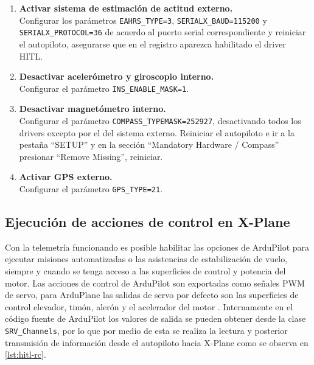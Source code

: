 \begin{enumerate}
    \item \textbf{Activar sistema de estimación de actitud externo.} \\
          Configurar los parámetros \texttt{EAHRS\_TYPE=3}, \texttt{SERIALX\_BAUD=115200} y \texttt{SERIALX\_PROTOCOL=36} de acuerdo al puerto serial correspondiente y reiniciar el autopiloto, asegurarse que en el registro aparezca habilitado el driver HITL.
    \item \textbf{Desactivar acelerómetro y giroscopio interno.} \\
          Configurar el parámetro \texttt{INS\_ENABLE\_MASK=1}.
    \item \textbf{Desactivar magnetómetro interno.} \\
          Configurar el parámetro \texttt{COMPASS\_TYPEMASK=252927}, desactivando todos los drivers excepto por el del sistema externo. Reiniciar el autopiloto e ir a la pestaña ``SETUP'' y en la sección ``Mandatory Hardware / Compass'' presionar ``Remove Missing'', reiniciar.
    \item \textbf{Activar GPS externo.} \\
          Configurar el parámetro \texttt{GPS\_TYPE=21}.
\end{enumerate}

\subsection{Ejecución de acciones de control en X-Plane}

Con la telemetría funcionando es posible habilitar las opciones de ArduPilot para ejecutar misiones automatizadas o las asistencias de estabilización de vuelo, siempre y cuando se tenga acceso a las superficies de control y potencia del motor. Las acciones de control de ArduPilot son exportadas como señales PWM de servo, para ArduPlane las salidas de servo por defecto son las superficies de control elevador, timón, alerón y el acelerador del motor \cite{arduplane-servo}. Internamente en el código fuente de ArduPilot los valores de salida se pueden obtener desde la clase \texttt{SRV\_Channels}, por lo que por medio de esta se realiza la lectura y posterior transmisión de información desde el autopiloto hacia X-Plane como se observa en \cref{lst:hitl-rc}.

